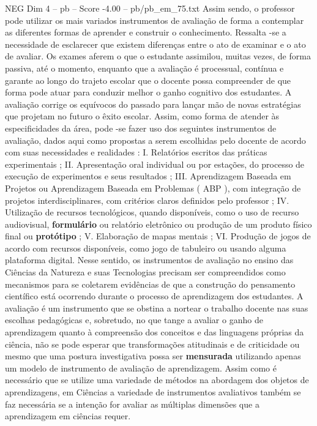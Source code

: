 \begin{textsample}{NEG Dim 4 – pb – Score -4.00 – pb/pb\_em\_75.txt}
Assim sendo, o professor pode utilizar os mais variados instrumentos de avaliação de forma a contemplar as diferentes formas de aprender e construir o conhecimento.
Ressalta -se a necessidade de esclarecer que existem diferenças entre o ato de examinar e o ato de avaliar.
Os exames aferem o que o estudante assimilou, muitas vezes, de forma passiva, até o momento, enquanto que a avaliação é processual, contínua e garante ao longo do trajeto escolar que o docente possa compreender de que forma pode atuar para conduzir melhor o ganho cognitivo dos estudantes.
A avaliação corrige os equívocos do passado para lançar mão de novas estratégias que projetam no futuro o êxito escolar.
Assim, como forma de atender às especificidades da área, pode -se fazer uso dos seguintes instrumentos de avaliação, dados aqui como propostas a serem escolhidas pelo docente de acordo com suas necessidades e realidades : I.
Relatórios escritos das práticas experimentais ; II.
Apresentação oral individual ou por estações, do processo de execução de experimentos e seus resultados ; III.
Aprendizagem Baseada em Projetos ou Aprendizagem Baseada em Problemas ( ABP ), com integração de projetos interdisciplinares, com critérios claros definidos pelo professor ; IV.
Utilização de recursos tecnológicos, quando disponíveis, como o uso de recurso audiovisual, \textbf{formulário} ou relatório eletrônico ou produção de um produto físico final ou \textbf{protótipo} ; V.
Elaboração de mapas mentais ; VI.
Produção de jogos de acordo com recursos disponíveis, como jogo de tabuleiro ou usando alguma plataforma digital.
Nesse sentido, os instrumentos de avaliação no ensino das Ciências da Natureza e suas Tecnologias precisam ser compreendidos como mecanismos para se coletarem evidências de que a construção do pensamento científico está ocorrendo durante o processo de aprendizagem dos estudantes.
A avaliação é um instrumento que se obstina a nortear o trabalho docente nas suas escolhas pedagógicas e, sobretudo, no que tange a avaliar o ganho de aprendizagem quanto à compreensão dos conceitos e das linguagens próprias da ciência, não se pode esperar que transformações atitudinais e de criticidade ou mesmo que uma postura investigativa possa ser \textbf{mensurada} utilizando apenas um modelo de instrumento de avaliação de aprendizagem.
Assim como é necessário que se utilize uma variedade de métodos na abordagem dos objetos de aprendizagens, em Ciências a variedade de instrumentos avaliativos também se faz necessária se a intenção for avaliar as múltiplas dimensões que a aprendizagem em ciências requer.

\end{textsample}
